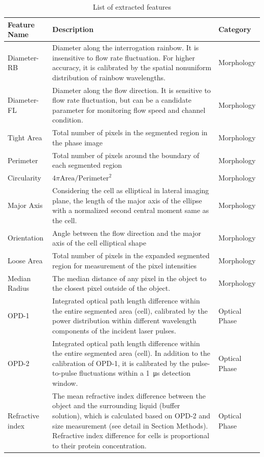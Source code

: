 \documentclass[aps,pra,reprint,superscriptaddress]{revtex4-1}
\begin{document}
\begin{table}[hb!]
\caption{\label{tbl:Features} List of extracted features}
\begin{tabular}{|p{}|p{}|p{}|}
\hline
Feature Name	 &Description	 &Category\\ \hline
Diameter-RB	 &Diameter along the interrogation rainbow. It is insensitive to flow rate fluctuation. For higher accuracy, it is calibrated by the spatial nonuniform distribution of rainbow wavelengths. 	 &Morphology\\ \hline
Diameter-FL	 &Diameter along the flow direction. It is sensitive to flow rate fluctuation, but can be a candidate parameter for monitoring flow speed and channel condition.	 &Morphology\\ \hline
Tight Area	 &Total number of pixels in the segmented region in the phase image	 &Morphology\\ \hline
Perimeter	 &Total number of pixels around the boundary of each segmented region	 &Morphology\\ \hline
Circularity	 &$4\pi \text{Area} / \text{Perimeter}^2$  &Morphology\\ \hline
Major Axis 	 &Considering the cell as elliptical in lateral imaging plane, the length of the major axis of the ellipse with a normalized second central moment same as the cell.	 &Morphology\\ \hline
Orientation	 &Angle between the flow direction and the major axis of the cell elliptical shape	 &Morphology\\ \hline
Loose Area	 &Total number of pixels in the expanded segmented region for measurement of the pixel intensities	 &Morphology\\ \hline
Median Radius	 &The median distance of any pixel in the object to the closest pixel outside of the object.	 &Morphology\\ \hline
OPD-1	 &Integrated optical path length difference within the entire segmented area (cell), calibrated by the power distribution within different wavelength components of the incident laser pulses.	 &Optical Phase\\ \hline
OPD-2	 &Integrated optical path length difference within the entire segmented area (cell). In addition to the calibration of OPD-1, it is calibrated by the pulse-to-pulse fluctuations within a \SI{1}{\micro\second} detection window.	 &Optical Phase\\ \hline
Refractive index	 &The mean refractive index difference between the object and the surrounding liquid (buffer solution), which is calculated based on OPD-2 and size measurement (see detail in Section Methods). Refractive index difference for cells is proportional to their protein concentration.	 &Optical Phase\\ \hline

\end{tabular}
\end{table}
\end{document}
